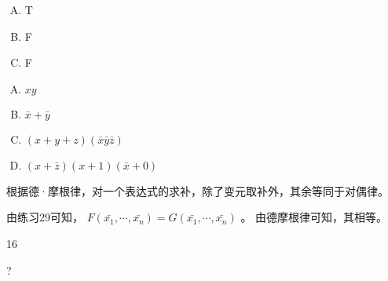 {{        %
        \begin{practices}
            \begin{enumerate}[A.]
                \item T
                \item F
                \item F
            \end{enumerate}
        \end{practices}

        \begin{practices}
            \begin{enumerate}[A.]
                \item $xy$
                \item $\bar{x} + \bar{y}$
                \item $(x + y + z)(\bar{x}\bar{y}\bar{z})$
                \item $(x + \bar{z})(x + 1)(\bar{x} + 0)$
            \end{enumerate}
        \end{practices}

        \begin{practices}
            根据德·摩根律，对一个表达式的求补，除了变元取补外，其余等同于对偶律。
        \end{practices}

        \begin{practices}
            由练习29可知， $F(\bar{x_1}, \cdots, \bar{x_n}) = G(\bar{x_1}, \cdots, \bar{x_n})$ 。
            由德摩根律可知，其相等。
        \end{practices}

        \begin{practices}
            16
        \end{practices}

        \begin{practices}
            ?
        \end{practices}

        \begin{practices}

        \end{practices}

        \begin{practices}

        \end{practices}

}}
